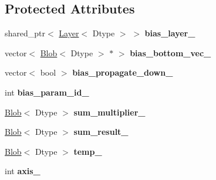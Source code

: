 \subsection*{Protected Attributes}
\begin{DoxyCompactItemize}
\item 
shared\+\_\+ptr$<$ \hyperlink{classcaffe_1_1Layer}{Layer}$<$ Dtype $>$ $>$ {\bfseries bias\+\_\+layer\+\_\+}\hypertarget{classcaffe_1_1ScaleLayer_a729919d5c422bd512cefbfa137c6c3e5}{}\label{classcaffe_1_1ScaleLayer_a729919d5c422bd512cefbfa137c6c3e5}

\item 
vector$<$ \hyperlink{classcaffe_1_1Blob}{Blob}$<$ Dtype $>$ $\ast$ $>$ {\bfseries bias\+\_\+bottom\+\_\+vec\+\_\+}\hypertarget{classcaffe_1_1ScaleLayer_aff534da4b37da270ca8be0acb260d1f5}{}\label{classcaffe_1_1ScaleLayer_aff534da4b37da270ca8be0acb260d1f5}

\item 
vector$<$ bool $>$ {\bfseries bias\+\_\+propagate\+\_\+down\+\_\+}\hypertarget{classcaffe_1_1ScaleLayer_a705b516d7ef3beec97987b903da1136e}{}\label{classcaffe_1_1ScaleLayer_a705b516d7ef3beec97987b903da1136e}

\item 
int {\bfseries bias\+\_\+param\+\_\+id\+\_\+}\hypertarget{classcaffe_1_1ScaleLayer_a70bdc932e2025afa58c392775db49fb7}{}\label{classcaffe_1_1ScaleLayer_a70bdc932e2025afa58c392775db49fb7}

\item 
\hyperlink{classcaffe_1_1Blob}{Blob}$<$ Dtype $>$ {\bfseries sum\+\_\+multiplier\+\_\+}\hypertarget{classcaffe_1_1ScaleLayer_a8b28a1886170855a18edf10d458b68e8}{}\label{classcaffe_1_1ScaleLayer_a8b28a1886170855a18edf10d458b68e8}

\item 
\hyperlink{classcaffe_1_1Blob}{Blob}$<$ Dtype $>$ {\bfseries sum\+\_\+result\+\_\+}\hypertarget{classcaffe_1_1ScaleLayer_a74069348b333ef013c9890af29eee8ee}{}\label{classcaffe_1_1ScaleLayer_a74069348b333ef013c9890af29eee8ee}

\item 
\hyperlink{classcaffe_1_1Blob}{Blob}$<$ Dtype $>$ {\bfseries temp\+\_\+}\hypertarget{classcaffe_1_1ScaleLayer_a6bb802aee5baea54028b9c27a26c8454}{}\label{classcaffe_1_1ScaleLayer_a6bb802aee5baea54028b9c27a26c8454}

\item 
int {\bfseries axis\+\_\+}\hypertarget{classcaffe_1_1ScaleLayer_a33d30568baa3ffc9c6df16af3860a6c1}{}\label{classcaffe_1_1ScaleLayer_a33d30568baa3ffc9c6df16af3860a6c1}


\end{DoxyCompactItemize}
